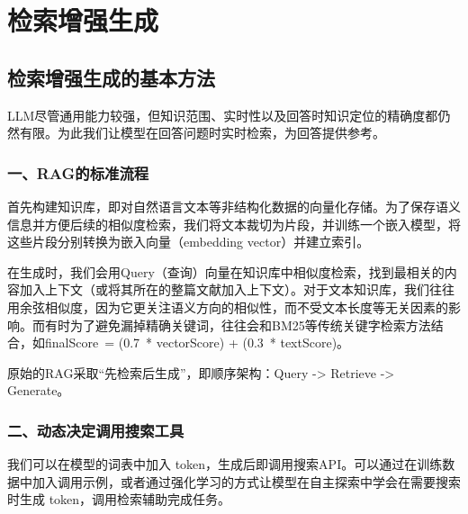 \hypertarget{ux68c0ux7d22ux589eux5f3aux751fux6210}{%
\chapter{检索增强生成}\label{ux68c0ux7d22ux589eux5f3aux751fux6210}}

\hypertarget{ux68c0ux7d22ux589eux5f3aux751fux6210ux7684ux57faux672cux65b9ux6cd5}{%
\section{检索增强生成的基本方法}\label{ux68c0ux7d22ux589eux5f3aux751fux6210ux7684ux57faux672cux65b9ux6cd5}}

LLM尽管通用能力较强，但知识范围、实时性以及回答时知识定位的精确度都仍然有限。为此我们让模型在回答问题时实时检索，为回答提供参考。

\hypertarget{ux4e00ragux7684ux6807ux51c6ux6d41ux7a0b}{%
\subsection{一、RAG的标准流程}\label{ux4e00ragux7684ux6807ux51c6ux6d41ux7a0b}}

首先构建知识库，即对自然语言文本等非结构化数据的向量化存储。为了保存语义信息并方便后续的相似度检索，我们将文本裁切为片段，并训练一个嵌入模型，将这些片段分别转换为嵌入向量（embedding vector）并建立索引。

在生成时，我们会用Query（查询）向量在知识库中相似度检索，找到最相关的内容加入上下文（或将其所在的整篇文献加入上下文）。对于文本知识库，我们往往用余弦相似度，因为它更关注语义方向的相似性，而不受文本长度等无关因素的影响。而有时为了避免漏掉精确关键词，往往会和BM25等传统关键字检索方法结合，如finalScore~= (0.7~* vectorScore) + (0.3~* textScore)。

原始的RAG采取``先检索后生成''，即顺序架构：Query -\textgreater{} Retrieve -\textgreater{} Generate。

\hypertarget{ux4e8cux52a8ux6001ux51b3ux5b9aux8c03ux7528ux641cux7d22ux5de5ux5177}{%
\subsection{二、动态决定调用搜索工具}\label{ux4e8cux52a8ux6001ux51b3ux5b9aux8c03ux7528ux641cux7d22ux5de5ux5177}}

我们可以在模型的词表中加入 token，生成后即调用搜索API。可以通过在训练数据中加入调用示例，或者通过强化学习的方式让模型在自主探索中学会在需要搜索时生成 token，调用检索辅助完成任务。

